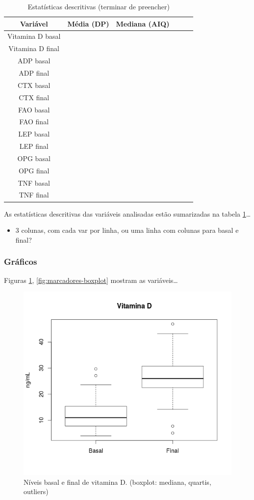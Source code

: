 \documentclass[a4paper]{article}
\begin{document}
\begin{table}[!h]
  \centering
  \begin{tabular}{c|ccccc}
    \hline
    Variável& Média (DP) &Mediana (AIQ)&&&\\
    \hline
    \hline
    Vitamina D basal&&&&&\\
    Vitamina D final&&&&&\\
    \hline
    ADP basal &&&&&\\
    ADP final&&&&&\\
    CTX basal &&&&&\\
    CTX final&&&&&\\
    FAO basal &&&&&\\
    FAO final&&&&&\\
    LEP basal &&&&&\\
    LEP final&&&&&\\
    OPG basal &&&&&\\
    OPG final&&&&&\\
    TNF basal &&&&&\\
    TNF final&&&&&\\
    \hline
  \end{tabular}
  \caption[Estatísticas descritivas]{Estatísticas descritivas (terminar de preencher)}
  \label{tab:descritivas}
\end{table}

As estatísticas descritivas das variáveis analisadas estão sumarizadas na tabela \ref{tab:descritivas}\ldots

\begin{itemize}
\item 3 colunas, com cada var por linha, ou uma linha com colunas para basal e final?
\end{itemize}

\subsubsection{Gráficos}

Figuras \ref{fig:vitd-boxplot}, \ref{fig:marcadores-boxplot} mostram as variáveis\ldots

\begin{figure}[!h]
  \centering
  \includegraphics[width=.5\textwidth]{../figuras/vitaminad}
  \caption[Níveis basal e final de vitamina D]{Níveis basal e final de vitamina D. (boxplot: mediana, quartis, outliers)}
  \label{fig:vitd-boxplot}
\end{figure}
\end{document}
